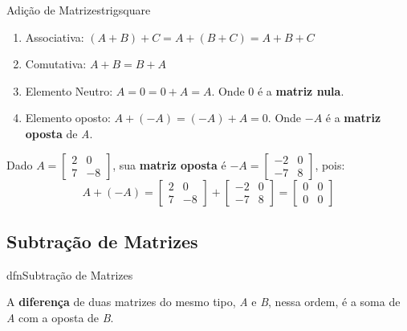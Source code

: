 \begin{proposition}{Adição de Matrizes}{trigsquare}
  \begin{enumerate}
    \item Associativa: $(A + B) + C = A + (B + C) = A + B + C$
    \item Comutativa: $A + B = B + A$
    \item Elemento Neutro: $A = 0 = 0 + A = A$. Onde $0$ é a \textbf{matriz nula}.
    \item Elemento oposto: $A + (-A) = (-A) + A = 0$. Onde $-A$ é a \textbf{matriz oposta} de \textit{A}.
  \end{enumerate}
\end{proposition}

\begin{example}
  Dado $A = \begin{bmatrix}
    2 & 0 \\
    7 & -8 
  \end{bmatrix}$,
  sua \textbf{matriz oposta} é $-A = \begin{bmatrix}
    -2 & 0 \\
    -7 & 8
  \end{bmatrix}$, pois:
  \begin{equation*}
    A + (-A) = \begin{bmatrix}
      2 & 0 \\
      7 & -8
    \end{bmatrix} + \begin{bmatrix}
      -2 & 0 \\
      -7 & 8 
    \end{bmatrix} = \begin{bmatrix}
      0 & 0 \\
      0 & 0
    \end{bmatrix}
  \end{equation*}
\end{example}

\subsection{Subtração de Matrizes}
dfn{Subtração de Matrizes}{
  A \textbf{diferença} de duas matrizes do mesmo tipo, \textit{A} e \textit{B}, nessa ordem, é a soma de \textit{A} com 
  a oposta de \textit{B}.

}

